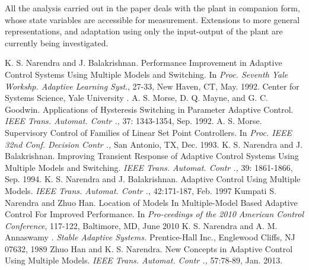 \documentclass[conference]{IEEEtran}
\begin{document}
All the analysis carried out in the paper deals with the plant in companion form, whose state variables are accessible for measurement. Extensions to more general representations, and adaptation using only the input-output of the plant are currently  being investigated.





























\begin{thebibliography}{1}

K. S. Narendra and J. Balakrishnan. Performance Improvement in Adaptive Control Systems Using Multiple Models and Switching. In \emph{Proc. Seventh Yale Workshp. Adaptive Learning Syst}., 27-33, New Haven, CT, May. 1992. Center for Systems Science, Yale University .
A. S. Morse, D. Q. Mayne, and G. C. Goodwin. Applications of Hysteresis Switching in Parameter Adaptive Control. \emph{IEEE Trans. Automat. Contr .,} 37: 1343-1354, Sep. 1992.
A. S. Morse. Supervisory Control of Families of Linear Set Point Controllers. In \emph{Proc. IEEE 32nd Conf. Decision Contr .,} San Antonio, TX, Dec. 1993.
K. S. Narendra and J. Balakrishnan. Improving Transient Response of Adaptive Control Systems Using Multiple Models and Switching. \emph{IEEE Trans. Automat. Contr .,} 39: 1861-1866, Sep. 1994.
K. S. Narendra and J. Balakrishnan. Adaptive Control Using Multiple Models. \emph{IEEE Trans. Automat. Contr .,} 42:171-187, Feb. 1997
Kumpati S. Narendra and Zhuo Han. Location of Models In Multiple-Model Based Adaptive Control For Improved Performance. In \emph{Pro-ceedings of the 2010 American Control Conference}, 117-122, Baltimore, MD, June 2010
K. S. Narendra and A. M. Annaswamy . \emph{Stable Adaptive Systems.} Prentice-Hall Inc., Englewood Cliffs, NJ 07632, 1989
Zhuo Han and K. S. Narendra. New Concepts in Adaptive Control Using Multiple Models.  \emph{IEEE Trans. Automat. Contr .,} 57:78-89, Jan. 2013.
\end{thebibliography}
\end{document}
